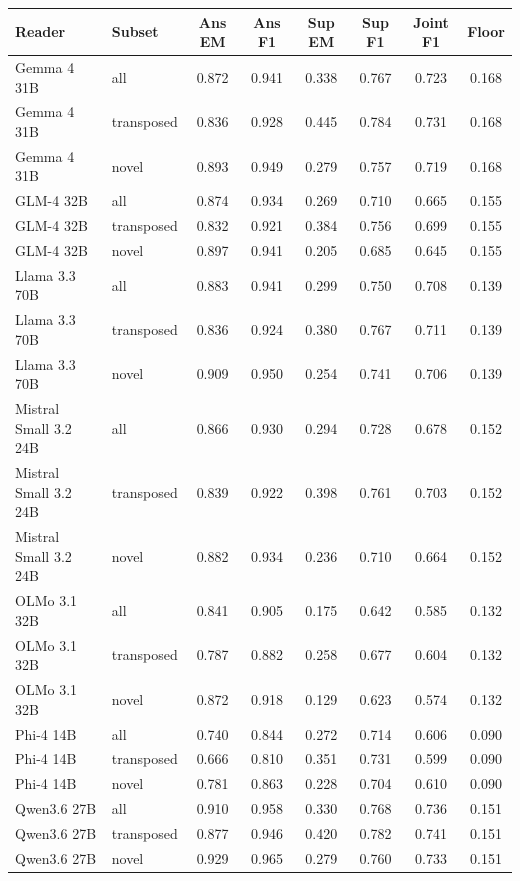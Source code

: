 \begin{tabular}{llcccccc}
\hline
Reader & Subset & Ans EM & Ans F1 & Sup EM & Sup F1 & Joint F1 & Floor\\
\hline
Gemma 4 31B & all & 0.872 & 0.941 & 0.338 & 0.767 & 0.723 & 0.168\\
Gemma 4 31B & transposed & 0.836 & 0.928 & 0.445 & 0.784 & 0.731 & 0.168\\
Gemma 4 31B & novel & 0.893 & 0.949 & 0.279 & 0.757 & 0.719 & 0.168\\
GLM-4 32B & all & 0.874 & 0.934 & 0.269 & 0.710 & 0.665 & 0.155\\
GLM-4 32B & transposed & 0.832 & 0.921 & 0.384 & 0.756 & 0.699 & 0.155\\
GLM-4 32B & novel & 0.897 & 0.941 & 0.205 & 0.685 & 0.645 & 0.155\\
Llama 3.3 70B & all & 0.883 & 0.941 & 0.299 & 0.750 & 0.708 & 0.139\\
Llama 3.3 70B & transposed & 0.836 & 0.924 & 0.380 & 0.767 & 0.711 & 0.139\\
Llama 3.3 70B & novel & 0.909 & 0.950 & 0.254 & 0.741 & 0.706 & 0.139\\
Mistral Small 3.2 24B & all & 0.866 & 0.930 & 0.294 & 0.728 & 0.678 & 0.152\\
Mistral Small 3.2 24B & transposed & 0.839 & 0.922 & 0.398 & 0.761 & 0.703 & 0.152\\
Mistral Small 3.2 24B & novel & 0.882 & 0.934 & 0.236 & 0.710 & 0.664 & 0.152\\
OLMo 3.1 32B & all & 0.841 & 0.905 & 0.175 & 0.642 & 0.585 & 0.132\\
OLMo 3.1 32B & transposed & 0.787 & 0.882 & 0.258 & 0.677 & 0.604 & 0.132\\
OLMo 3.1 32B & novel & 0.872 & 0.918 & 0.129 & 0.623 & 0.574 & 0.132\\
Phi-4 14B & all & 0.740 & 0.844 & 0.272 & 0.714 & 0.606 & 0.090\\
Phi-4 14B & transposed & 0.666 & 0.810 & 0.351 & 0.731 & 0.599 & 0.090\\
Phi-4 14B & novel & 0.781 & 0.863 & 0.228 & 0.704 & 0.610 & 0.090\\
Qwen3.6 27B & all & 0.910 & 0.958 & 0.330 & 0.768 & 0.736 & 0.151\\
Qwen3.6 27B & transposed & 0.877 & 0.946 & 0.420 & 0.782 & 0.741 & 0.151\\
Qwen3.6 27B & novel & 0.929 & 0.965 & 0.279 & 0.760 & 0.733 & 0.151\\
\hline
\end{tabular}

